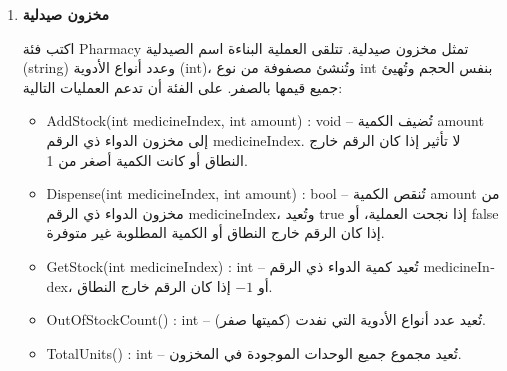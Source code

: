 \documentclass[14pt]{extarticle}
\begin{document}
\begin{enumerate}
{\begin{boxSolution}
\begin{english}
\begin{verbatim}
    public int StudentCount()
    {
        return grades.Length;
    }
}

public static void Main(string[] args)
{
    Classroom cls = new Classroom(10, 5);
    cls.SetGrade(0, 55);
    cls.SetGrade(1, 70);
    cls.SetGrade(2, 90);
    cls.SetGrade(3, 45);
    cls.SetGrade(4, 80);
    Console.WriteLine("Average: "    + cls.Average());    // 68.0
    Console.WriteLine("Passed: "     + cls.PassCount());  // 3
}
\end{verbatim}
\end{english}
\end{boxSolution}
}
\fi
\clearpage

\item \textbf{مخزون صيدلية}

اكتب فئة \textenglish{Pharmacy} تمثل مخزون صيدلية.
تتلقى العملية البناءة اسم الصيدلية (\textenglish{string}) وعدد أنواع الأدوية (\textenglish{int})،
وتُنشئ مصفوفة من نوع \textenglish{int} بنفس الحجم وتُهيئ جميع قيمها بالصفر.
على الفئة أن تدعم العمليات التالية:

\begin{itemize}
  \item \textenglish{AddStock(int medicineIndex, int amount) : void} --
        تُضيف الكمية \textenglish{amount} إلى مخزون الدواء ذي الرقم \textenglish{medicineIndex}.
        لا تأثير إذا كان الرقم خارج النطاق أو كانت الكمية أصغر من 1.

  \item \textenglish{Dispense(int medicineIndex, int amount) : bool} --
        تُنقص الكمية \textenglish{amount} من مخزون الدواء ذي الرقم \textenglish{medicineIndex}،
        وتُعيد \textenglish{true} إذا نجحت العملية،
        أو \textenglish{false} إذا كان الرقم خارج النطاق أو الكمية المطلوبة غير متوفرة.

  \item \textenglish{GetStock(int medicineIndex) : int} --
        تُعيد كمية الدواء ذي الرقم \textenglish{medicineIndex}،
        أو $-1$ إذا كان الرقم خارج النطاق.

  \item \textenglish{OutOfStockCount() : int} --
        تُعيد عدد أنواع الأدوية التي نفدت (كميتها صفر).

  \item \textenglish{TotalUnits() : int} --
        تُعيد مجموع جميع الوحدات الموجودة في المخزون.
\end{itemize}


\end{enumerate}
\end{document}
